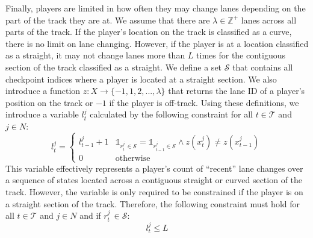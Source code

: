 Finally, players are limited in how often they may change lanes depending on the part of the track they are at. We assume that there are $\lambda \in \mathbb{Z^+}$ lanes across all parts of the track. If the player's location on the track is classified as a curve, there is no limit on lane changing. However, if the player is at a location classified as a straight, it may not change lanes more than $L$ times for the contiguous section of the track classified as a straight. We define a set $\mathcal{S}$ that contains all checkpoint indices where a player is located at a straight section. We also introduce a function $z: X \rightarrow \{-1, 1, 2, ..., \lambda\}$ that returns the lane ID of a player's position on the track or $-1$ if the player is off-track. Using these definitions, we introduce a variable $l^j_t$ calculated by the following constraint for all $t \in \mathcal{T}$ and $j \in N$:
\begin{equation} \label{eq:gen_lane_var}
    l^j_{t} =  \begin{cases} l^j_{t-1} + 1 & \mathds{1}_{r^j_t \, \in \mathcal{S}} = \mathds{1}_{r^j_{t-1} \in \mathcal{S}}\wedge z(x^j_t) \neq z(x^j_{t-1}) \\
    0 & \text{otherwise}  \end{cases}
\end{equation}
This variable effectively represents a player's count of ``recent'' lane changes over a sequence of states located across a contiguous straight or curved section of the track. However, the variable is only required to be constrained if the player is on a straight section of the track. Therefore, the following constraint must hold for all $t \in \mathcal{T}$ and $j \in N$ and if $r^j_t \, \in \mathcal{S}$:
\begin{equation} \label{eq:gen_lane_lim}
    l^j_{t} \leq  L
\end{equation}
